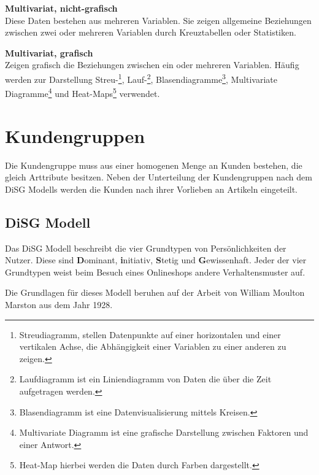 \textbf{Multivariat, nicht-grafisch}\\
Diese Daten bestehen aus mehreren Variablen. Sie zeigen allgemeine Beziehungen zwischen zwei oder mehreren Variablen durch Kreuztabellen oder Statistiken.\vspace{0.2cm}
 
\textbf{Multivariat, grafisch}\\
Zeigen grafisch die Beziehungen zwischen ein oder mehreren Variablen. Häufig werden zur Darstellung Streu-\footnote{Streudiagramm, stellen Datenpunkte auf einer horizontalen und einer vertikalen Achse, die Abhängigkeit einer Variablen zu einer anderen zu zeigen.}, Lauf-\footnote{Laufdiagramm ist ein Liniendiagramm von Daten die über die Zeit aufgetragen werden.}, Blasendiagramme\footnote{Blasendiagramm ist eine Datenvisualisierung mittels Kreisen.}, Multivariate Diagramme\footnote{Multivariate Diagramm ist eine grafische Darstellung zwischen Faktoren und einer Antwort.} und Heat-Maps\footnote{Heat-Map hierbei werden die Daten durch Farben dargestellt.} verwendet.


\section{Kundengruppen}
Die Kundengruppe muss aus einer homogenen Menge an Kunden bestehen, die gleich Arttribute besitzen. Neben der Unterteilung der Kundengruppen nach dem DiSG Modells werden die Kunden nach ihrer Vorlieben an Artikeln eingeteilt.

\subsection{DiSG Modell}
Das DiSG Modell beschreibt die vier Grundtypen von Persönlichkeiten der Nutzer. Diese sind \textbf{D}ominant, \textbf{i}nitiativ, \textbf{S}tetig und \textbf{G}ewissenhaft. Jeder der vier Grundtypen weist beim Besuch eines Onlineshops andere Verhaltensmuster auf.\vspace{0.2cm}

Die Grundlagen für dieses Modell beruhen auf der Arbeit von William Moulton Marston aus dem Jahr 1928.

